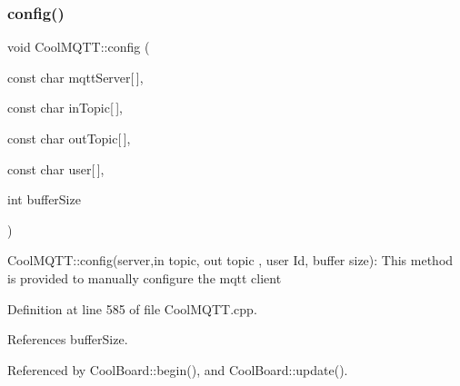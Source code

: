 \subsubsection{\texorpdfstring{config()}{config()}\hspace{0.1cm}{\footnotesize\ttfamily [1/2]}}
{\footnotesize\ttfamily void Cool\+M\+Q\+T\+T\+::config (\begin{DoxyParamCaption}\item[{const char}]{mqtt\+Server\mbox{[}$\,$\mbox{]},  }\item[{const char}]{in\+Topic\mbox{[}$\,$\mbox{]},  }\item[{const char}]{out\+Topic\mbox{[}$\,$\mbox{]},  }\item[{const char}]{user\mbox{[}$\,$\mbox{]},  }\item[{int}]{buffer\+Size }\end{DoxyParamCaption})}

Cool\+M\+Q\+T\+T\+::config(server,in topic, out topic , user Id, buffer size)\+: This method is provided to manually configure the mqtt client 

Definition at line 585 of file Cool\+M\+Q\+T\+T.\+cpp.



References buffer\+Size.



Referenced by Cool\+Board\+::begin(), and Cool\+Board\+::update().


